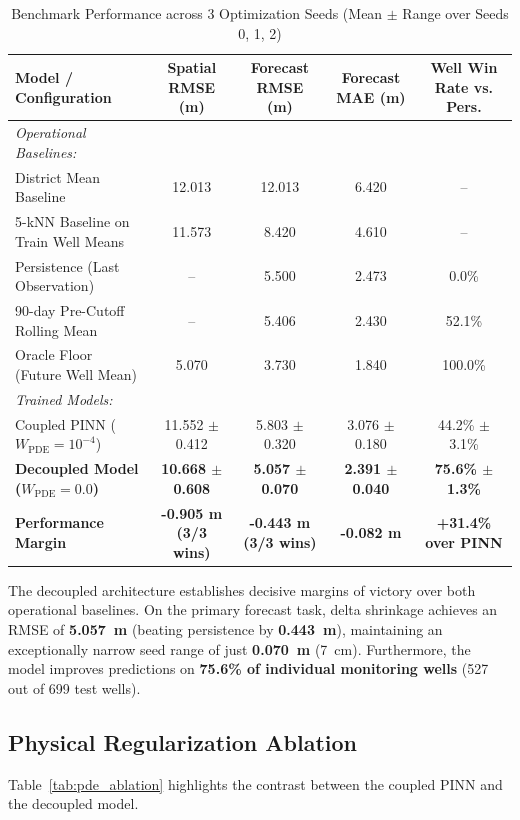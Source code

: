 \documentclass[10pt,conference,letterpaper]{IEEEtran}
\begin{document}
\begin{table}[t]
\centering
\caption{Benchmark Performance across 3 Optimization Seeds (Mean $\pm$ Range over Seeds 0, 1, 2)}
\label{tab:main_results}
\begin{tabular}{lcccc}
\toprule
\textbf{Model / Configuration} & \textbf{Spatial RMSE (m)} & \textbf{Forecast RMSE (m)} & \textbf{Forecast MAE (m)} & \textbf{Well Win Rate vs. Pers.} \\
\midrule
\textit{Operational Baselines:} & & & & \\
District Mean Baseline & 12.013 & 12.013 & 6.420 & -- \\
5-kNN Baseline on Train Well Means & 11.573 & 8.420 & 4.610 & -- \\
Persistence (Last Observation) & -- & 5.500 & 2.473 & 0.0\% \\
90-day Pre-Cutoff Rolling Mean & -- & 5.406 & 2.430 & 52.1\% \\
Oracle Floor (Future Well Mean) & 5.070 & 3.730 & 1.840 & 100.0\% \\
\midrule
\textit{Trained Models:} & & & & \\
Coupled PINN ($W_{\text{PDE}} = 10^{-4}$) & 11.552 $\pm$ 0.412 & 5.803 $\pm$ 0.320 & 3.076 $\pm$ 0.180 & 44.2\% $\pm$ 3.1\% \\
\textbf{Decoupled Model ($W_{\text{PDE}} = 0.0$)} & \textbf{10.668 $\pm$ 0.608} & \textbf{5.057 $\pm$ 0.070} & \textbf{2.391 $\pm$ 0.040} & \textbf{75.6\% $\pm$ 1.3\%} \\
\midrule
\textbf{Performance Margin} & \textbf{-0.905 m (3/3 wins)} & \textbf{-0.443 m (3/3 wins)} & \textbf{-0.082 m} & \textbf{+31.4\% over PINN} \\
\bottomrule
\end{tabular}
\end{table}

The decoupled architecture establishes decisive margins of victory over both operational baselines. On the primary forecast task, delta shrinkage achieves an RMSE of \textbf{5.057~m} (beating persistence by \textbf{0.443~m}), maintaining an exceptionally narrow seed range of just \textbf{0.070~m} (7~cm). Furthermore, the model improves predictions on \textbf{75.6\% of individual monitoring wells} (527 out of 699 test wells).

\subsection{Physical Regularization Ablation}
Table~\ref{tab:pde_ablation} highlights the contrast between the coupled PINN and the decoupled model.
\end{document}
